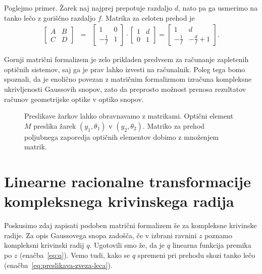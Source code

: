 Poglejmo primer. Žarek naj najprej prepotuje razdaljo $d$, nato pa ga usmerimo
na tanko lečo z goriščno razdaljo $f$. Matrika za celoten prehod je
\begin{eqnarray}
\left[\begin{array}{cc}
A & B\\
C & D
\end{array}\right] & = & \left[\begin{array}{cc}
1 & 0\\
-\frac{1}{f} & 1
\end{array}\right]\cdot\left[\begin{array}{cc}
1 & d\\
0 & 1
\end{array}\right] =  \left[\begin{array}{cc}
1 & d\\
-\frac{1}{f} & -\frac{d}{f}+1
\end{array}\right].
\label{eq:Mdf}
\end{eqnarray}


Gornji matrični formalizem je zelo prikladen predvsem za računanje zapletenih
optičnih sistemov, saj ga je prav lahko izvesti na računalnik. Poleg
tega bomo spoznali, da je enolično povezan z matričnim formalizmom izračuna
kompleksne ukrivljenosti Gaussovih snopov, zato da preprosto možnost
prenosa rezultatov računov geometrijske optike v optiko
snopov.

\begin{figure}
\centering\small
\centering\small
\caption{
Preslikave žarkov lahko obravnavamo
z matrikami. Optični element $M$ preslika žarek $(y_{1},\theta_{1})$
v $(y_{2},\theta_{2})$. Matriko za prehod poljubnega zaporedja optičnih
 elementov dobimo z množenjem matrik.}
\label{fig:K-matricni-obravnavi}
\end{figure}

\section{Linearne racionalne transformacije kompleksnega krivinskega radija}

Poskusimo zdaj zapisati podoben matrični formalizem še za kompleksne krivinske
radije. Za opis Gaussovega snopa zadošča, če v izbrani ravnini $z$ poznamo kompleksni
krivinski radij $q$. Ugotovili smo že, da je $q$ linearna funkcija
premika po $z$ (enačba~\ref{eq:q}). Vemo tudi, kako se $q$ spremeni pri prehodu skozi tanko
lečo (enačba~\ref{eq:preslikava-zveza-leca}). 


